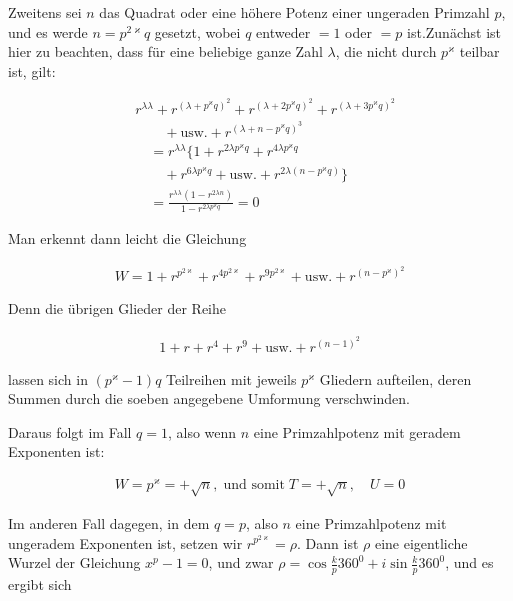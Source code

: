 
Zweitens sei $n$ das Quadrat oder eine höhere Potenz einer ungeraden Primzahl $p$, und es werde $n=p^{2\varkappa}q$ gesetzt, wobei $q$ entweder $=1$ oder $=p$ ist.\quad Zunächst ist hier zu beachten, dass für eine beliebige ganze Zahl $\lambda$, die nicht durch $p^\varkappa$ teilbar ist, gilt:


\[
\begin{aligned}
&r^{\lambda\lambda}+r^{(\lambda+p^\varkappa q)^2}+r^{(\lambda+2p^\varkappa q)^2}+r^{(\lambda+3p^\varkappa q)^2}\\&\qquad+\text{usw.}+r^{(\lambda+n-p^\varkappa q)^{3}}\\
&\quad=r^{\lambda\lambda}\{1+r^{2\lambda p^\varkappa q}+r^{4\lambda p^\varkappa q}\\&\qquad+r^{6\lambda p^\varkappa q}+\text{usw.}+r^{2\lambda(n-p^\varkappa q)}\}\\&\quad=\frac{r^{\lambda\lambda}(1-r^{2\lambda n})}{1-r^{2\lambda p^\varkappa q}}=0
\end{aligned}
\]

Man erkennt dann leicht die Gleichung

\[
\begin{aligned}
W=1+r^{p^{2\varkappa}}+r^{4p^{2\varkappa}}+r^{9p^{2\varkappa}}+\text{usw.}+r^{(n-p^\varkappa)^2}
\end{aligned}
\]

Denn die übrigen Glieder der Reihe

\[
\begin{aligned}
1+r+r^4+r^9+\text{usw.}+r^{(n-1)^2}
\end{aligned}
\]

lassen sich in $(p^\varkappa-1)q$ Teilreihen mit jeweils $p^\varkappa$ Gliedern aufteilen, deren Summen durch die soeben angegebene Umformung verschwinden.

Daraus folgt im Fall $q=1$, also wenn $n$ eine Primzahlpotenz mit geradem Exponenten ist:

\[
\begin{aligned}
W=p^\varkappa=+\surd n,\;\text{und somit}\;T=+\surd n,\quad U=0
\end{aligned}
\]

Im anderen Fall dagegen, in dem $q=p$, also $n$ eine Primzahlpotenz mit ungeradem Exponenten ist, setzen wir $r^{p^{2\varkappa}}=\rho$. Dann ist $\rho$ eine eigentliche Wurzel der Gleichung $x^p-1=0$, und zwar $\rho=\cos\frac{k}{p}360^0+i\sin\frac{k}{p}360^0$, und es ergibt sich

